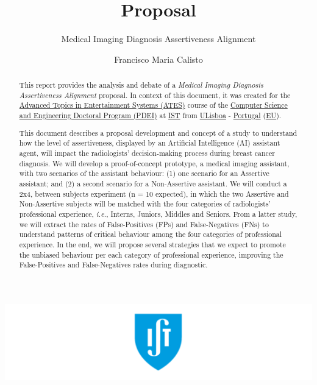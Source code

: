 \documentclass[sigchi]{acmart}
\begin{document}
\title{Proposal}
\subtitle{Medical Imaging Diagnosis Assertiveness Alignment}

\author{Francisco Maria Calisto}

\renewcommand{\shortauthors}{Calisto}


\begin{abstract}

This report provides the analysis and debate of a \textit{Medical Imaging Diagnosis Assertiveness Alignment} proposal.
In context of this document, it was created for the \hyperlink{https://fenix.tecnico.ulisboa.pt/disciplinas/TASE4/2019-2020/2-semestre}{Advanced Topics in Entertainment Systems (ATES)} course of the \hyperlink{https://fenix.tecnico.ulisboa.pt/cursos/deic/curriculo}{Computer Science and Engineering Doctoral Program (PDEI)} at \hyperlink{https://tecnico.ulisboa.pt/en/}{IST} from \hyperlink{https://www.ulisboa.pt/}{ULisboa} - \hyperlink{https://www.portugal.gov.pt/en/}{Portugal} (\hyperlink{https://europa.eu}{EU}).

This document describes a proposal development and concept of a study to understand how the level of assertiveness, displayed by an Artificial Intelligence (AI) assistant agent, will impact the radiologists' decision-making process during breast cancer diagnosis.
We will develop a proof-of-concept prototype, a medical imaging assistant, with two scenarios of the assistant behaviour:
(1) one scenario for an Assertive assistant; and
(2) a second scenario for a Non-Assertive assistant.
We will conduct a 2x4, between subjects experiment (n = 10 expected), in which the two Assertive and Non-Assertive subjects will be matched with the four categories of radiologists' professional experience, {\it i.e.}, Interns, Juniors, Middles and Seniors.
From a latter study, we will extract the rates of False-Positives (FPs) and False-Negatives (FNs) to understand patterns of critical behaviour among the four categories of professional experience.
In the end, we will propose several strategies that we expect to promote the unbiased behaviour per each category of professional experience, improving the False-Positives and False-Negatives rates during diagnostic.

\end{abstract}

\begin{teaserfigure}
\includegraphics[width=\textwidth]{teaser}
\end{teaserfigure}


\maketitle



\break



\end{document}
